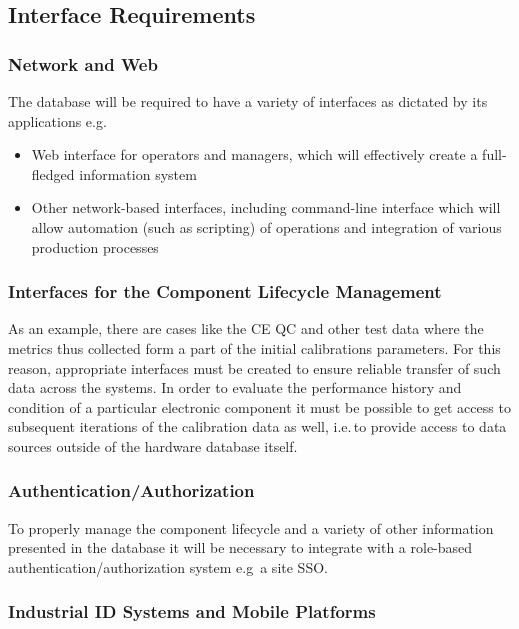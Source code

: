 \documentclass[pdftex,12pt,letter]{article}
\begin{document}
\subsection{Interface Requirements}

\subsubsection{Network and Web}

The database will be required to have a variety of interfaces as dictated by its applications e.g.

\begin{itemize}

\item Web interface for operators and managers, which will effectively create a full-fledged information system

\item Other network-based interfaces, including command-line interface which will allow automation (such as scripting) of operations
and integration of various production processes

\end{itemize}


\subsubsection{Interfaces for the Component Lifecycle Management}
As an example, there are cases like the CE QC and other test data where the metrics thus collected form a part of the
initial calibrations parameters. For this reason, appropriate interfaces must be created to ensure
reliable transfer of such data across the systems. In order to evaluate the performance history and condition of a particular
electronic component it must be possible to get access to subsequent iterations
of the calibration data as well, i.e.\,to provide access to data sources outside of the hardware database itself.

\subsubsection{Authentication/Authorization}
To properly manage the component lifecycle and a variety of other information presented in the database it will be necessary
to integrate with a role-based authentication/authorization system e.g\, a site SSO.

\subsubsection{Industrial ID Systems and Mobile Platforms}
\end{document}
